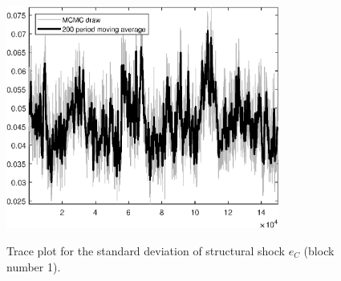 \begin{figure}[H]
\centering
  \includegraphics[width=0.8\textwidth]{BRS_gen/graphs/TracePlot_SE_e_C_blck_1}\\
    \caption{Trace plot for the standard deviation of structural shock ${e_C}$ (block number 1).}
\end{figure}
